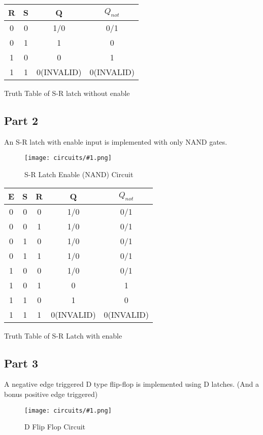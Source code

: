 \documentclass[pdftex,12pt,a4paper]{article}
\theoremstyle{plain}
\newcommand{\circuit}[1]{
    \begin{figure}[H]
    	\centering
    	\texttt{[image: circuits/\#1.png]}
    	\caption{#1 Circuit}
    	\label{fig7}
    \end{figure}
    \vspace{1cm}
}
\begin{document}
        \begin{center}
            \begin{tabular}{c c | c c}
                R & S & Q & $Q_{not}$ \\
                \hline 
                0 & 0 & 1/0 & 0/1 \\
                0 & 1 & 1 & 0 \\
                1 & 0 & 0 & 1 \\
                1 & 1 & 0(INVALID) & 0(INVALID) \\
            \end{tabular}
        \end{center}
        {\centering Truth Table of S-R latch without enable\\}

    \newpage
    \subsection{Part 2}
        An S-R latch with enable input is implemented with only NAND gates.
        \circuit{S-R Latch Enable (NAND)}

        \begin{center}
            \begin{tabular}{c c c | c c}
                E & S & R & Q & $Q_{not}$ \\
                \hline 
                0 & 0 & 0 & 1/0 & 0/1 \\
                0 & 0 & 1 & 1/0 & 0/1 \\
                0 & 1 & 0 & 1/0 & 0/1 \\
                0 & 1 & 1 & 1/0 & 0/1 \\
                1 & 0 & 0 & 1/0 & 0/1 \\
                1 & 0 & 1 & 0 & 1 \\
                1 & 1 & 0 & 1 & 0  \\
                1 & 1 & 1 & 0(INVALID) & 0(INVALID) \\
            \end{tabular}
        \end{center}
        {\centering Truth Table of S-R Latch with enable\\}
        
    \newpage
    \subsection{Part 3}
        A negative edge triggered D type flip-flop is implemented using D latches. (And a bonus positive edge triggered)
        \circuit{D Flip Flop}
\end{document}
